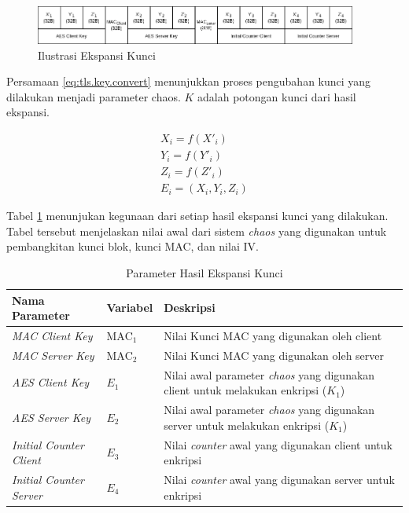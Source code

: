 \begin{figure}[!h]
  \centering
  \includegraphics[width=400px]{chapters/res/chapter-3/img/keyexpansion.png}
  \caption{Ilustrasi Ekspansi Kunci} \label{fig:tls.keyexpansion}
\end{figure}

Persamaan \ref{eq:tls.key.convert} menunjukkan proses pengubahan kunci yang dilakukan menjadi parameter chaos. $K$ adalah potongan kunci dari hasil ekspansi.

\begin{equation}
  \begin{aligned}
    X_i = f(X'_i) \\
    Y_i = f(Y'_i) \\
    Z_i = f(Z'_i) \\
    E_i = (X_i, Y_i, Z_i)
  \end{aligned}
  \label{eq:tls.key.convert}
\end{equation}

Tabel \ref{tab:tls.keyexpansion} menunjukan kegunaan dari setiap hasil ekspansi kunci yang dilakukan. Tabel tersebut menjelaskan nilai awal dari sistem \emph{chaos} yang digunakan untuk pembangkitan kunci blok, kunci MAC, dan nilai IV.

\begin{table}[!h]
  \centering
  \caption{Parameter Hasil Ekspansi Kunci} \label{tab:tls.keyexpansion}
  \begin{tabular}{|p{3cm}|p{3cm}|p{6cm}|}
    \hline
    Nama Parameter & Variabel & Deskripsi \\
    \hline
    \emph{MAC Client Key} & $\text{MAC}_1$ & Nilai Kunci MAC yang digunakan oleh client \\ \hline
    \emph{MAC Server Key} & $\text{MAC}_2$ & Nilai Kunci MAC yang digunakan oleh server \\ \hline
    \emph{AES Client Key}  & $E_1$ & Nilai awal  parameter \emph{chaos} yang digunakan client untuk melakukan enkripsi ($K_1$) \\ \hline
    \emph{AES Server Key}  & $E_2$ & Nilai awal parameter \emph{chaos} yang digunakan server untuk melakukan enkripsi ($K_1$) \\ \hline
    \emph{Initial Counter Client}  & $E_3$ & Nilai \emph{counter} awal yang digunakan client untuk enkripsi \\ \hline
    \emph{Initial Counter Server}  & $E_4$ & Nilai \emph{counter} awal yang digunakan server untuk enkripsi \\
    \hline
  \end{tabular}
\end{table}

